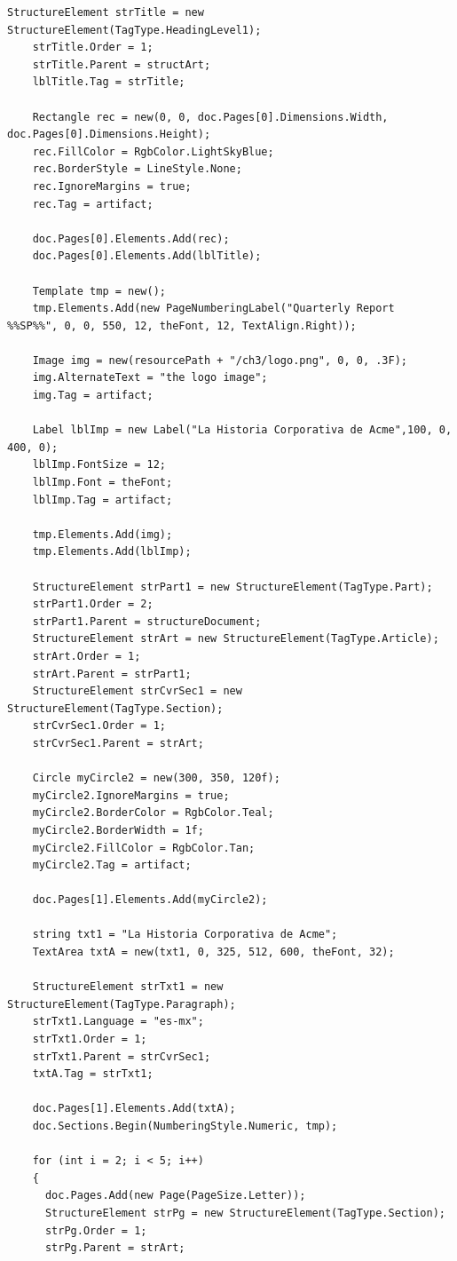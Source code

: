 \documentclass[american]{tufte-book}
\numberwithin{equation}{section}
\numberwithin{figure}{section}
\begin{document}
{{\begin{lstlisting}[caption={Identifying items as artifacts to avoid tagging.},label={lis:Identifying-items-as},basicstyle={\footnotesize\ttfamily},breaklines=true]
    StructureElement strTitle = new StructureElement(TagType.HeadingLevel1);
    strTitle.Order = 1;
    strTitle.Parent = structArt;
    lblTitle.Tag = strTitle;

    Rectangle rec = new(0, 0, doc.Pages[0].Dimensions.Width, doc.Pages[0].Dimensions.Height);
    rec.FillColor = RgbColor.LightSkyBlue;
    rec.BorderStyle = LineStyle.None;
    rec.IgnoreMargins = true;
    rec.Tag = artifact;

    doc.Pages[0].Elements.Add(rec);
    doc.Pages[0].Elements.Add(lblTitle);

    Template tmp = new();
    tmp.Elements.Add(new PageNumberingLabel("Quarterly Report  %%SP%%", 0, 0, 550, 12, theFont, 12, TextAlign.Right));

    Image img = new(resourcePath + "/ch3/logo.png", 0, 0, .3F);
    img.AlternateText = "the logo image";
    img.Tag = artifact;

    Label lblImp = new Label("La Historia Corporativa de Acme",100, 0, 400, 0);
    lblImp.FontSize = 12;
    lblImp.Font = theFont;
    lblImp.Tag = artifact;

    tmp.Elements.Add(img);
    tmp.Elements.Add(lblImp);

    StructureElement strPart1 = new StructureElement(TagType.Part);
    strPart1.Order = 2;
    strPart1.Parent = structureDocument;
    StructureElement strArt = new StructureElement(TagType.Article);
    strArt.Order = 1;
    strArt.Parent = strPart1;
    StructureElement strCvrSec1 = new StructureElement(TagType.Section);
    strCvrSec1.Order = 1;
    strCvrSec1.Parent = strArt;

    Circle myCircle2 = new(300, 350, 120f);
    myCircle2.IgnoreMargins = true;
    myCircle2.BorderColor = RgbColor.Teal;
    myCircle2.BorderWidth = 1f;
    myCircle2.FillColor = RgbColor.Tan;
    myCircle2.Tag = artifact;

    doc.Pages[1].Elements.Add(myCircle2);

    string txt1 = "La Historia Corporativa de Acme";
    TextArea txtA = new(txt1, 0, 325, 512, 600, theFont, 32);

    StructureElement strTxt1 = new StructureElement(TagType.Paragraph);
    strTxt1.Language = "es-mx";
    strTxt1.Order = 1;
    strTxt1.Parent = strCvrSec1;
    txtA.Tag = strTxt1;

    doc.Pages[1].Elements.Add(txtA);
    doc.Sections.Begin(NumberingStyle.Numeric, tmp);

    for (int i = 2; i < 5; i++)
    {
      doc.Pages.Add(new Page(PageSize.Letter));
      StructureElement strPg = new StructureElement(TagType.Section);
      strPg.Order = 1;
      strPg.Parent = strArt;
      

\end{lstlisting}}}
\end{document}
